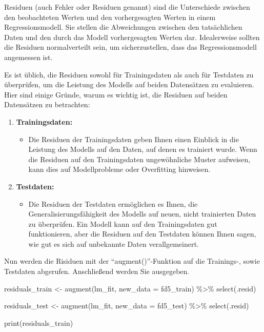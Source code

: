 \documentclass[
  letterpaper,
  DIV=11,
  numbers=noendperiod]{scrartcl}
\newenvironment{Shaded}{\begin{snugshade}}{\end{snugshade}}
\newcommand{\AttributeTok}[1]{\textcolor[rgb]{0.40,0.45,0.13}{#1}}
\newcommand{\FunctionTok}[1]{\textcolor[rgb]{0.28,0.35,0.67}{#1}}
\newcommand{\NormalTok}[1]{\textcolor[rgb]{0.00,0.23,0.31}{#1}}
\newcommand{\OtherTok}[1]{\textcolor[rgb]{0.00,0.23,0.31}{#1}}
\newcommand{\SpecialCharTok}[1]{\textcolor[rgb]{0.37,0.37,0.37}{#1}}
\providecommand{\tightlist}{%
  \setlength{\itemsep}{0pt}\setlength{\parskip}{0pt}}\usepackage{longtable,booktabs,array}
\begin{document}
Residuen (auch Fehler oder Residuen genannt) sind die Unterschiede
zwischen den beobachteten Werten und den vorhergesagten Werten in einem
Regressionsmodell. Sie stellen die Abweichungen zwischen den
tatsächlichen Daten und den durch das Modell vorhergesagten Werten dar.
Idealerweise sollten die Residuen normalverteilt sein, um
sicherzustellen, dass das Regressionsmodell angemessen ist.

Es ist üblich, die Residuen sowohl für Trainingsdaten als auch für
Testdaten zu überprüfen, um die Leistung des Modells auf beiden
Datensätzen zu evaluieren. Hier sind einige Gründe, warum es wichtig
ist, die Residuen auf beiden Datensätzen zu betrachten:

\begin{enumerate}
\def\labelenumi{\arabic{enumi}.}
\item
  \textbf{Trainingsdaten:}

  \begin{itemize}
  \tightlist
  \item
    Die Residuen der Trainingsdaten geben Ihnen einen Einblick in die
    Leistung des Modells auf den Daten, auf denen es trainiert wurde.
    Wenn die Residuen auf den Trainingsdaten ungewöhnliche Muster
    aufweisen, kann dies auf Modellprobleme oder Overfitting hinweisen.
  \end{itemize}
\item
  \textbf{Testdaten:}

  \begin{itemize}
  \tightlist
  \item
    Die Residuen der Testdaten ermöglichen es Ihnen, die
    Generalisierungsfähigkeit des Modells auf neuen, nicht trainierten
    Daten zu überprüfen. Ein Modell kann auf den Trainingsdaten gut
    funktionieren, aber die Residuen auf den Testdaten können Ihnen
    sagen, wie gut es sich auf unbekannte Daten verallgemeinert.
  \end{itemize}
\end{enumerate}

Nun werden die Risiduen mit der ``augment()''-Funktion auf die
Trainings-, sowie Testdaten abgerufen. Anschließend werden Sie
ausgegeben.

\begin{Shaded}
\begin{Highlighting}[]
\NormalTok{residuals\_train }\OtherTok{\textless{}{-}} \FunctionTok{augment}\NormalTok{(lm\_fit, }\AttributeTok{new\_data =}\NormalTok{ fd5\_train) }\SpecialCharTok{\%\textgreater{}\%} \FunctionTok{select}\NormalTok{(.resid)}

\NormalTok{residuals\_test }\OtherTok{\textless{}{-}} \FunctionTok{augment}\NormalTok{(lm\_fit, }\AttributeTok{new\_data =}\NormalTok{ fd5\_test) }\SpecialCharTok{\%\textgreater{}\%} \FunctionTok{select}\NormalTok{(.resid)}

\FunctionTok{print}\NormalTok{(residuals\_train)}
\end{Highlighting}
\end{Shaded}
\end{document}
